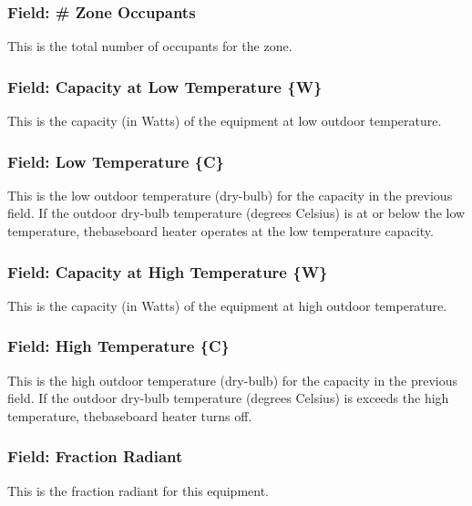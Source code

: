 \subsubsection{Field: \# Zone Occupants}\label{field-zone-occupants-4}

This is the total number of occupants for the zone.

\subsubsection{Field: Capacity at Low Temperature \{W\}}\label{field-capacity-at-low-temperature-w}

This is the capacity (in Watts) of the equipment at low outdoor temperature.

\subsubsection{Field: Low Temperature \{C\}}\label{field-low-temperature-c}

This is the low outdoor temperature (dry-bulb) for the capacity in the previous field. If the outdoor dry-bulb temperature (degrees Celsius) is at or below the low temperature, thebaseboard heater operates at the low temperature capacity.

\subsubsection{Field: Capacity at High Temperature \{W\}}\label{field-capacity-at-high-temperature-w}

This is the capacity (in Watts) of the equipment at high outdoor temperature.

\subsubsection{Field: High Temperature \{C\}}\label{field-high-temperature-c}

This is the high outdoor temperature (dry-bulb) for the capacity in the previous field. If the outdoor dry-bulb temperature (degrees Celsius) is exceeds the high temperature, thebaseboard heater turns off.

\subsubsection{Field: Fraction Radiant}\label{field-fraction-radiant-4}

This is the fraction radiant for this equipment.

